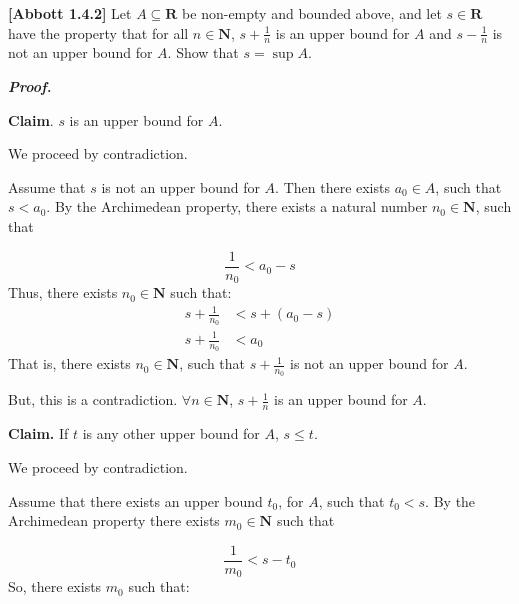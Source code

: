 \documentclass[10pt]{article}
\begin{document}
\textbf{[Abbott 1.4.2]} Let $\displaystyle A\subseteq \mathbf{R}$ be non-empty and bounded above, and let $\displaystyle s\in \mathbf{R}$ have the property that for all $\displaystyle n\in \mathbf{N}$, $\displaystyle s+\frac{1}{n}$ is an upper bound for $\displaystyle A$ and $\displaystyle s-\frac{1}{n}$ is not an upper bound for $\displaystyle A$. Show that $\displaystyle s=\sup A$.



\textbf{\textit{Proof.}}

\textbf{Claim}. $\displaystyle s$ is an upper bound for $\displaystyle A$. 

We proceed by contradiction. 



Assume that $\displaystyle s$ is not an upper bound for $\displaystyle A$. Then there exists $\displaystyle a_{0} \in A$, such that $\displaystyle s< a_{0}$. By the Archimedean property, there exists a natural number $\displaystyle n_{0} \in \mathbf{N}$, such that


\begin{equation*}
\frac{1}{n_{0}} < a_{0} -s
\end{equation*}
Thus, there exists $\displaystyle n_{0} \in \mathbf{N}$ such that:
\begin{equation*}
\begin{aligned}
s+\frac{1}{n_{0}} & < s+( a_{0} -s)\\
s+\frac{1}{n_{0}} & < a_{0}
\end{aligned}
\end{equation*}
That is, there exists $\displaystyle n_{0} \in \mathbf{N}$, such that $\displaystyle s+\frac{1}{n_{0}}$ is not an upper bound for $\displaystyle A$.

But, this is a contradiction. $\displaystyle \forall n\in \mathbf{N}$, $\displaystyle s+\frac{1}{n}$ is an upper bound for $\displaystyle A$.



\textbf{Claim.} If $\displaystyle t$ is any other upper bound for $\displaystyle A$, $\displaystyle s\leq t$.

We proceed by contradiction.



Assume that there exists an upper bound $\displaystyle t_{0}$, for $\displaystyle A$, such that $\displaystyle t_{0} < s$. By the Archimedean property there exists $\displaystyle m_{0} \in \mathbf{N}$ such that 


\begin{equation*}
\frac{1}{m_{0}} < s-t_{0}
\end{equation*}
 So, there exists $\displaystyle m_{0}$ such that:
\end{document}
